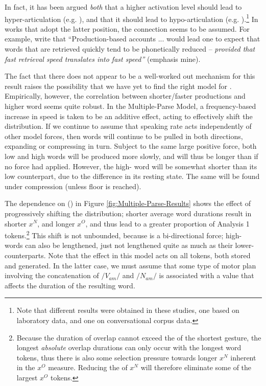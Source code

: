 In fact, it has been argued \emph{both} that a higher activation level
should lead to hyper-articulation (e.g. \citealt{Baese-Berk2009}),
and that it should lead to hypo-articulation (e.g. \citealt{gahl2012reduce}).\footnote{Note that different results were obtained in these studies, one based
on laboratory data, and one on conversational corpus data.} In works that adopt the latter position, the connection seems to
be assumed. For example, \citet[79]{gahl2012reduce}
write that “Production-based accounts ... would lead one to expect
that words that are retrieved quickly tend to be phonetically reduced
– \emph{provided that fast retrieval speed translates into fast 
speed”} (emphasis mine).

The fact that there does not appear to be a well-worked out mechanism
for this result raises the possibility that we have yet to find the
right model for . Empirically, however, the correlation between
shorter/faster productions and higher word  seems quite robust.
In the Multiple-Parse Model, a frequency-based increase in 
speed is taken to be an additive effect, acting to effectively shift
the  distribution. If we continue to assume that speaking
rate acts independently of other model forces, then words will continue
to be pulled in both directions, expanding or compressing in turn.
Subject to the same large positive force, both low and high 
words will be produced more slowly, and will thus be longer than if
no force had applied. However, the high- word will be somewhat
shorter than its low  counterpart, due to the difference
in its resting state. The same will be found under compression (unless
floor is reached).

The dependence on  () in Figure \ref{fig:Multiple-Parse-Results}
shows the effect of progressively shifting the  distribution;
shorter average word durations result in shorter $x^{N}$, and longer
$x^{O}$, and thus lead to a greater proportion of Analysis 1 tokens.\footnote{Because the duration of overlap cannot exceed the  of the shortest
gesture, the longest \emph{absolute} overlap durations can only occur
with the longest word tokens, thus there is also some selection pressure
towards longer $x^{N}$ inherent in the $x^{O}$ measure. Reducing
the  of $x^{N}$ will therefore eliminate some of the largest
$x^{O}$ tokens.} This shift is not unbounded, because  is a bi-directional
force; high- words can also be lengthened, just not lengthened
quite as much as their lower- counterparts. Note that the
 effect in this model acts on all tokens, both stored and
generated. In the latter case, we must assume that some type of motor
plan involving the concatenation of $/V_{am}/$ and $/N_{am}/$ is
associated with a  value that affects the duration
of the resulting word. 


